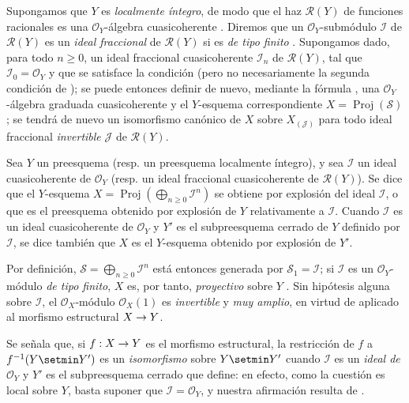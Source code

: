 \documentclass[oneside,10pt]{amsart}
\makeatletter
\renewcommand{\geq}{\geqslant}
\newcommand{\ega@arrow}[2]{\mathchoice{#1}{#2}{#2}{#2}}
\renewcommand{\to}{\ega@arrow{\longrightarrow}{\rightarrow}}
\let\EGAOriginalLabel\label
\renewcommand{\label}[1]{\phantomsection\EGAOriginalLabel{#1}}
\makeatother
\begin{document}
\begin{env}[8.1.2]
\label{II.8.1.2-fr}
Supongamos que $Y$ es \emph{localmente íntegro}, de modo que el haz $\mathcal{R}(Y)$ de funciones racionales es una $\mathcal{O}_Y$-álgebra cuasicoherente .
Diremos que un $\mathcal{O}_Y$-submódulo $\mathcal{I}$ de $\mathcal{R}(Y)$ es un \emph{ideal fraccional} de $\mathcal{R}(Y)$ si es \emph{de tipo finito} .
Supongamos dado, para todo $n\geq0$, un ideal fraccional cuasicoherente $\mathcal{I}_n$ de $\mathcal{R}(Y)$, tal que $\mathcal{I}_0=\mathcal{O}_Y$ y que se satisface la condición  (pero no necesariamente la segunda condición de );
se puede entonces definir de nuevo, mediante la fórmula , una $\mathcal{O}_Y$-álgebra graduada cuasicoherente y el $Y$-esquema correspondiente $X=\operatorname{Proj}(\mathcal{S})$;
se tendrá de nuevo un isomorfismo canónico de $X$ sobre $X_{(\mathcal{J})}$ para todo ideal fraccional \emph{invertible} $\mathcal{J}$ de $\mathcal{R}(Y)$.
\end{env}

\begin{definition}[8.1.3]
\label{II.8.1.3-fr}
Sea $Y$ un preesquema \textup{(resp.} un preesquema localmente íntegro), y sea $\mathcal{I}$ un ideal cuasicoherente de $\mathcal{O}_Y$ \textup{(resp.} un ideal fraccional cuasicoherente de $\mathcal{R}(Y)$).
Se dice que el $Y$-esquema
$X=\operatorname{Proj}(\bigoplus_{n\geq0}\mathcal{I}^n)$
se obtiene por explosión del ideal $\mathcal{I}$, o que es el preesquema obtenido por explosión de $Y$ relativamente a $\mathcal{I}$.
Cuando $\mathcal{I}$ es un ideal cuasicoherente de $\mathcal{O}_Y$ y $Y'$ es el subpreesquema cerrado de $Y$ definido por $\mathcal{I}$, se dice también que $X$ es el $Y$-esquema obtenido por explosión de $Y'$.
\end{definition}

Por definición, $\mathcal{S}=\bigoplus_{n\geq0}\mathcal{I}^n$ está entonces generada por $\mathcal{S}_1=\mathcal{I}$;
si $\mathcal{I}$ es un $\mathcal{O}_Y$-módulo \emph{de tipo finito}, $X$ es, por tanto, \emph{proyectivo} sobre $Y$ .
Sin hipótesis alguna sobre $\mathcal{I}$, el $\mathcal{O}_X$-módulo $\mathcal{O}_X(1)$ es \emph{invertible}  y \emph{muy amplio}, en virtud de  aplicado al morfismo estructural $X\to Y$.

Se señala que, si $f:X\to Y$ es el morfismo estructural, la restricción de $f$ a $f^{-1}(Y\setmin Y')$ es un \emph{isomorfismo} sobre $Y\setmin Y'$ cuando $\mathcal{I}$ es un \emph{ideal de $\mathcal{O}_Y$} y $Y'$ es el subpreesquema cerrado que define:
en efecto, como la cuestión es local sobre $Y$, basta suponer que $\mathcal{I}=\mathcal{O}_Y$, y nuestra afirmación resulta de .
\end{document}

